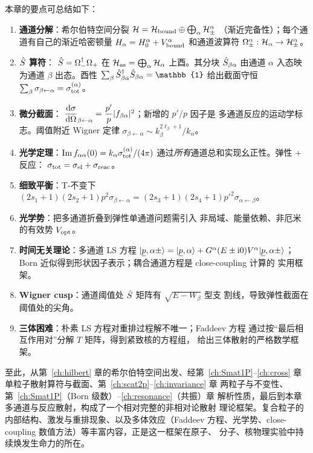 本章的要点可总结如下：

\begin{enumerate}
  \item \textbf{通道分解}：希尔伯特空间分裂
    $\mathcal{H}=\mathcal{H}_{\rm bound}\oplus\bigoplus_\alpha\mathcal{H}_\pm^\alpha$
    （渐近完备性）；每个通道有自己的渐近哈密顿量
    $H_\alpha=H_0^\alpha+V_{\rm bound}^\alpha$ 和通道波算符
    $\Omega_\pm^\alpha:\mathcal{H}_\alpha\to\mathcal{H}_\pm^\alpha$。
  \item \textbf{$\hat{S}$ 算符}：
    $\hat{S}=\Omega_-^\dagger\Omega_+$ 在 $\mathcal{H}_{\rm as}=\bigoplus_\alpha\mathcal{H}_\alpha$
    上酉。其分块 $\hat{S}_{\beta\alpha}$ 由通道 $\alpha$ 入态映为通道
    $\beta$ 出态。酉性 $\sum_\beta\Smat_{\beta\alpha}^\dagger\Smat_{\beta\alpha}=\mathbb{1}$
    给出截面守恒 $\sum_\beta\sigma_{\beta\leftarrow\alpha}=\sigma_{\rm tot}^{(\alpha)}$。
  \item \textbf{微分截面}：
    $\dfrac{\mathrm{d}\sigma}{\mathrm{d}\Omega}_{\beta\leftarrow\alpha}=
    \dfrac{p'}{p}|f_{\beta\alpha}|^2$；新增的 $p'/p$ 因子是
    多通道反应的运动学标志。阈值附近 Wigner 定律
    $\sigma_{\beta\leftarrow\alpha}\sim k_\beta^{2\ell_\beta+1}/k_\alpha$。
  \item \textbf{光学定理}：$\Im f_{\alpha\alpha}(0)=k_\alpha\sigma_{\rm tot}^{(\alpha)}/(4\pi)$
    通过\emph{所有}通道总和实现幺正性。弹性 + 反应：
    $\sigma_{\rm tot}=\sigma_{\rm el}+\sigma_{\rm reac}$。
  \item \textbf{细致平衡}：T-不变下
    $(2s_1+1)(2s_2+1)p^2\sigma_{\beta\leftarrow\alpha}=
     (2s_3+1)(2s_4+1)p'^2\sigma_{\alpha\leftarrow\beta}$。
  \item \textbf{光学势}：把多通道折叠到弹性单通道问题需引入
    非局域、能量依赖、非厄米的有效势 $V_{\rm opt}$。
  \item \textbf{时间无关理论}：多通道 LS 方程
    $|\underline{p},\alpha\pm\rangle=|\underline{p},\alpha\rangle
    +G^\alpha(E\pm\mathrm{i} 0)V^\alpha|\underline{p},\alpha\pm\rangle$；
    Born 近似得到形状因子表示；耦合通道方程是 close-coupling 计算的
    实用框架。
  \item \textbf{Wigner cusp}：通道阈值处 $\hat{S}$ 矩阵有 $\sqrt{E-W_\beta}$ 型支
    割线，导致弹性截面在阈值处的尖角。
  \item \textbf{三体困难}：朴素 LS 方程对重排过程解不唯一；Faddeev 方程
    通过按“最后相互作用对”分解 $T$ 矩阵，得到紧致核的方程组，
    给出三体散射的严格数学框架。
\end{enumerate}

至此，从第~\ref{ch:hilbert} 章的希尔伯特空间出发、经第~\ref{ch:Smat1P}--\ref{ch:cross} 章
单粒子散射算符与截面、第~\ref{ch:scat2p}--\ref{ch:invariance} 章
两粒子与不变性、第~\ref{ch:Smat1P}（Born 级数）--\ref{ch:resonance}（共振）章
解析性质，最后到本章多通道与反应散射，构成了一个相对完整的非相对论散射
理论框架。复合粒子的内部结构、激发与重排现象、以及多体效应（Faddeev
方程、光学势、close-coupling 数值方法）等丰富内容，正是这一框架在原子、
分子、核物理实验中持续焕发生命力的所在。
